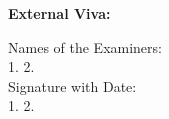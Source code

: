 \documentclass[a4paper,12pt]{report}
\begin{document}
\begin{titlepage}
\begin{center}
    \end{center}
    \Large
    \textbf{External Viva:} \\[0.3cm]


    \vspace{1.5cm}
    \begin{center}
        Names of the Examiners: \\[0.5cm] 
        1. \hspace{5cm} 2. \\[0.5cm]
        Signature with Date: \\[0.5cm]
        1. \hspace{5cm} 2.
    \end{center}
    
\end{titlepage}
\end{document}
